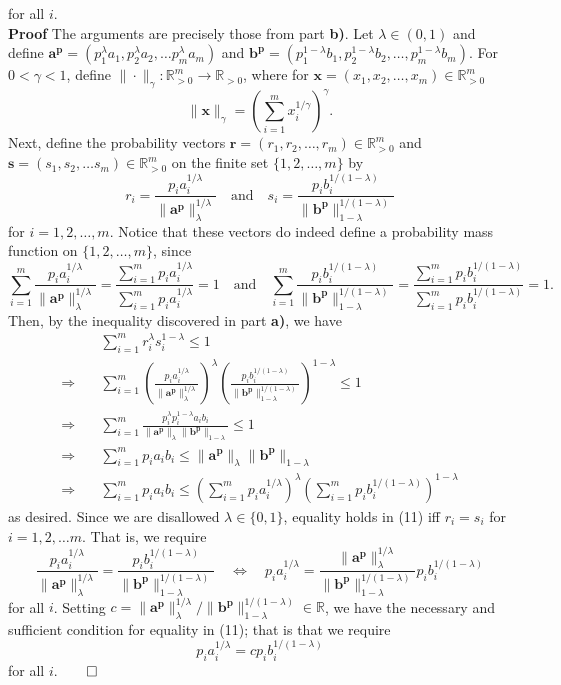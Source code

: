 \documentclass[11pt, letterpaper]{article}
\newcommand{\bs}[1]{\boldsymbol{#1}}
\newcommand{\mbb}[1]{\mathbb{#1}}
\begin{document}
for all $i$.\\[10pt]
{\bf Proof} The arguments are precisely those from part {\bf b)}. Let $\lambda\in(0,1)$ and define $\bs{a^p}=(p_1^\lambda a_1,p_2^\lambda a_2,\dots p_m^\lambda a_m)$ and $\bs{b^p}=(p_1^{1-\lambda}b_1,p_2^{1-\lambda}b_2,\dots,p_m^{1-\lambda}b_m)$.
For $0<\gamma<1$, define $\|\cdot\|_\gamma:\mbb{R}^m_{>0}\rightarrow\mbb{R}_{>0}$, where for $\bs{x}=(x_1,x_2,\dots,x_m)\in\mbb{R}^m_{>0}$
\[\|\bs{x}\|_\gamma=\left(\sum_{i=1}^mx_i^{1/\gamma}\right)^\gamma.\]
Next, define the probability vectors $\bs{r}=(r_1,r_2,\dots,r_m)\in\mbb{R}^m_{>0}$ and $\bs{s}=(s_1,s_2,\dots s_m)\in\mbb{R}^m_{>0}$ on the finite set $\{1,2,\dots, m\}$ by
\[r_i=\frac{p_ia_i^{1/\lambda}}{\|\bs{a^p}\|_\lambda^{1/\lambda}}\quad\text{and}\quad s_i=\frac{p_ib_i^{1/(1-\lambda)}}{\|\bs{b^p}\|_{1-\lambda}^{1/(1-\lambda)}}\]
for $i=1,2,\dots,m$. Notice that these vectors do indeed define a probability mass function on $\{1,2,\dots,m\}$, since
\[\sum_{i=1}^m\frac{p_ia_i^{1/\lambda}}{\|\bs{a^p}\|_\lambda^{1/\lambda}}=\frac{\sum_{i=1}^mp_ia_i^{1/\lambda}}{\sum_{i=1}^mp_ia_i^{1/\lambda}}=1\quad\text{and}\quad\sum_{i=1}^m\frac{p_ib_i^{1/(1-\lambda)}}{\|\bs{b^p}\|_{1-\lambda}^{1/(1-\lambda)}}=\frac{\sum_{i=1}^mp_ib_i^{1/(1-\lambda)}}{\sum_{i=1}^mp_ib_i^{1/(1-\lambda)}}=1.\]
Then, by the inequality discovered in part {\bf a)}, we have
\begin{align*}
    &\sum_{i=1}^mr_i^\lambda s_i^{1-\lambda}\leq 1\\
    \Rightarrow\quad&\sum_{i=1}^m\left(\frac{p_ia_i^{1/\lambda}}{\|\bs{a^p}\|_\lambda^{1/\lambda}}\right)^\lambda\left(\frac{p_ib_i^{1/(1-\lambda)}}{\|\bs{b^p}\|_{1-\lambda}^{1/(1-\lambda)}}\right)^{1-\lambda}\leq 1\\
    \Rightarrow\quad&\sum_{i=1}^m\frac{p_i^\lambda p_i^{1-\lambda}a_ib_i}{\|\bs{a^p}\|_\lambda\|\bs{b^p}\|_{1-\lambda}}\leq 1\\
    \Rightarrow\quad&\sum_{i=1}^mp_ia_ib_i\leq\|\bs{a^p}\|_\lambda\|\bs{b^p}\|_{1-\lambda}\\
    \Rightarrow\quad&\sum_{i=1}^mp_ia_ib_i\leq\left(\sum_{i=1}^mp_ia_i^{1/\lambda}\right)^{\lambda}\left(\sum_{i=1}^mp_ib_i^{1/(1-\lambda)}\right)^{1-\lambda}\tag{11}
\end{align*}
as desired. Since we are disallowed $\lambda\in\{0,1\}$, equality holds in (11) iff $r_i=s_i$ for $i=1,2,\dots m$. That is, we require
\[\frac{p_ia_i^{1/\lambda}}{\|\bs{a^p}\|_\lambda^{1/\lambda}}=\frac{p_ib_i^{1/(1-\lambda)}}{\|\bs{b^p}\|_{1-\lambda}^{1/(1-\lambda)}}\quad\Leftrightarrow\quad p_ia_i^{1/\lambda}=\frac{\|\bs{a^p}\|_\lambda^{1/\lambda}}{\|\bs{b^p}\|_{1-\lambda}^{1/(1-\lambda)}}p_ib_i^{1/(1-\lambda)}\]
for all $i$. Setting $c=\|\bs{a^p}\|_{\lambda}^{1/\lambda}/\|\bs{b^p}\|_{1-\lambda}^{1/(1-\lambda)}\in\mbb{R}$, we have the necessary and sufficient condition for equality in (11); that is that we require
\[p_ia_i^{1/\lambda}=cp_ib_i^{1/(1-\lambda)}\]
for all $i$.\hfill{$\qed$}
\end{document}
